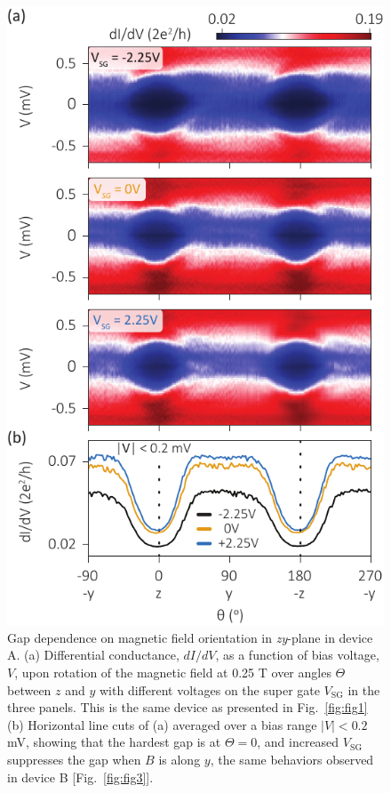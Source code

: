 \begin{figure}
\begin{center}
\centering
\includegraphics[width=0.6\columnwidth]{chapter_spinorbit/figures/SFig4_YZrot_Full1_reproduced.pdf}
\caption{\label{fig:YZrotRep}
Gap dependence on magnetic field orientation in \textit{zy}-plane in device A.
(a) Differential conductance, $dI/dV$, as a function of bias voltage, $V$, upon rotation of the magnetic field at 0.25 T over angles $\Theta$ between $z$ and $y$ with different voltages on the super gate $V_{\mathrm{SG}}$ in the three panels.
This is the same device as presented in Fig.~\ref{fig:fig1}(b) Horizontal line cuts of (a) averaged over a bias range $|V| < 0.2$ mV, showing that the hardest gap is at $\Theta = 0$, and increased $V_{\mathrm{SG}}$ suppresses the gap when $B$ is along $y$, the same behaviors observed in device B [Fig.~\ref{fig:fig3}].
}
\end{center}
\end{figure}

